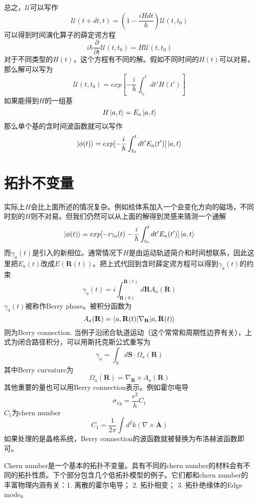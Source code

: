 总之，$\mathscr{U}$可以写作
\begin{equation}
  \mathscr{U}(t + dt, t) = (1 - \frac{iH dt}{\hbar}) \mathscr{U}(t, t_0)
\end{equation}
可以得到时间演化算子的薛定谔方程
\begin{equation}
  i\hbar\frac{\partial}{\partial t} \mathscr{U}(t, t_0) = H\mathscr{U}(t, t_0)
\end{equation}
对于不同类型的$H(t)$，这个方程有不同的解。假如不同时间的$H(t)$可以对易，那么解可以写为
\begin{equation}
  \mathscr{U}(t, t_0) = exp[-\frac{i}{\hbar} \int_{t_0}^{t} dt' H(t') ]
\end{equation}
如果能得到$H$的一组基
\begin{equation}
  H \ket{a, t} = E_a \ket{a, t}
\end{equation}
那么单个基的含时间波函数就可以写作
\begin{equation}
  \ket{\phi(t)} = exp[-\frac{i}{\hbar} \int_{t_0}^{t} dt' E_a(t') ] \ket{a, t}
\end{equation}

\section{拓扑不变量}

实际上$H$会比上面所述的情况复杂。例如给体系加入一个会变化方向的磁场，不同时刻的$H$则不对易。但我们仍然可以从上面的解得到灵感来猜测一个通解
\begin{equation}
  \ket{\phi(t)} = exp[- i \gamma_a(t) -\frac{i}{\hbar} \int_{t_0}^{t} dt' E_a(t') ] \ket{a, t}
\end{equation}
而$\gamma_{a}(t)$是引入的新相位。通常情况下$H$是由运动轨迹简介和时间想联系，因此这里把$E_a(t)$改成$E(\mathbf{R}(t))$。把上式代回到含时薛定谔方程可以得到$\gamma_a(t)$的约束
\begin{equation}
  \gamma_a(t) = i \int_{\mathbf{R}(0)}^{\mathbf{R}(t)}{d\mathbf{R}} A_a(\mathbf{R})
\end{equation}
$\gamma_a(t)$被称作Berry phase。被积分函数为
\begin{equation}
  A_a(\mathbf{R}) = \braket{a, \mathbf{R}(t) | \nabla_{\mathbf{R}} | a, \mathbf{R}(t)}
\end{equation}
则为Berry connection. 当例子沿闭合轨道运动（这个常常和周期性边界有关），上式为闭合路径积分，可以用斯托克斯公式重写为
\begin{equation}
  \gamma_a = \int_{S}{d\mathbf{S}} \cdot \Omega_a(\mathbf{R})
\end{equation}
其中Berry curvature为
\begin{equation}
\Omega_a(\mathbf{R}) = \nabla_{\mathbf{R}} \times A_a(\mathbf{R})
\end{equation}
其他重要的量也可以用Berry connection表示。例如霍尔电导
\begin{equation}
  \sigma_{xy} = \frac{e^2}{h}C_1
  \label{hallInduc}
\end{equation}
$C_1$为chern number
\begin{equation}
  C_1 = \frac{1}{2 \pi} \int{d^2k}(\nabla \times \mathbf{A})
\end{equation}
如果处理的是晶格系统，Berry connection的波函数就被替换为布洛赫波函数即可。

Chern number是一个基本的拓扑不变量。具有不同的chern number的材料会有不同的拓扑性质。下个部分包含几个低拓扑模型的例子。它们都和chern number的丰富物理内涵有关：1. 离散的霍尔电导； 2. 拓扑相变； 3. 拓扑绝缘体的Edge mode。
